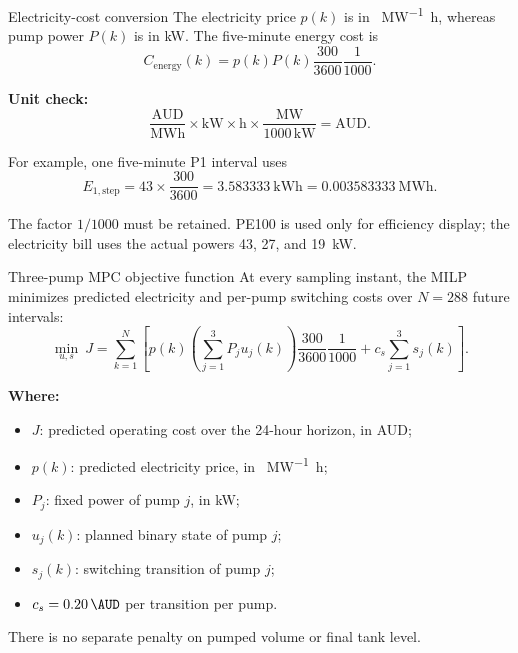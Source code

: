 \documentclass[t,12pt]{beamer}
\begin{document}
\begin{frame}{Electricity-cost conversion}
The electricity price $p(k)$ is in \si{\AUD\per\mega\watt\hour}, whereas
pump power $P(k)$ is in \si{\kilo\watt}.  The five-minute energy cost is
\[
  C_{\mathrm{energy}}(k)
  =p(k)P(k)\frac{300}{3600}\frac{1}{1000}.
\]

\textbf{Unit check:}
\[
  \frac{\mathrm{AUD}}{\mathrm{MWh}}
  \times\mathrm{kW}
  \times\mathrm{h}
  \times\frac{\mathrm{MW}}{1000\,\mathrm{kW}}
  =\mathrm{AUD}.
\]

For example, one five-minute P1 interval uses
\[
  E_{1,\mathrm{step}}=43\times\frac{300}{3600}
  =\SI{3.583333}{\kilo\watt\hour}
  =\SI{0.003583333}{\mega\watt\hour}.
\]

The factor $1/1000$ must be retained.  PE100 is used only for efficiency
display; the electricity bill uses the actual powers 43, 27, and
\SI{19}{\kilo\watt}.
\end{frame}

\begin{frame}{Three-pump MPC objective function}
At every sampling instant, the MILP minimizes predicted electricity and
per-pump switching costs over $N=288$ future intervals:
\[
  \min_{u,s}\ J=
  \sum_{k=1}^{N}\left[
    p(k)\left(\sum_{j=1}^{3}P_j u_j(k)\right)
    \frac{300}{3600}\frac{1}{1000}
    +c_s\sum_{j=1}^{3}s_j(k)
  \right].
\]

\textbf{Where:}
\begin{itemize}
  \item $J$: predicted operating cost over the 24-hour horizon, in AUD;
  \item $p(k)$: predicted electricity price, in \si{\AUD\per\mega\watt\hour};
  \item $P_j$: fixed power of pump $j$, in \si{\kilo\watt};
  \item $u_j(k)$: planned binary state of pump $j$;
  \item $s_j(k)$: switching transition of pump $j$;
  \item $c_s=\SI{0.20}{\AUD}$ per transition per pump.
\end{itemize}

There is no separate penalty on pumped volume or final tank level.
\end{frame}
\end{document}
